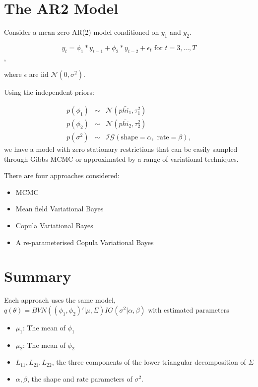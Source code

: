 \documentclass{article}
\begin{document}

\section{The AR2 Model}

Consider a mean zero AR(2) model conditioned on $y_1$ and $y_2$.

$$y_t = \phi_1 * y_{t-1} + \phi_2 * y_{t-2} + \epsilon_t \mbox{ for } t = 3,\dots,T$$,

where $\epsilon$ are iid $\mathcal{N}(0, \sigma^2)$.

Using the independent priors: 

\begin{eqnarray*}
p(\phi_1) & \sim & \mathcal{N}(\bar{phi_1}, \tau_{1}^2) \\
p(\phi_2) & \sim & \mathcal{N}(\bar{phi_2}, \tau_{2}^2) \\
p(\sigma^2) & \sim & \mathcal{IG} (\mbox{shape} = \alpha, \mbox{ rate} = \beta),
\end{eqnarray*}
we have a model with zero stationary restrictions that can be easily sampled through Gibbs MCMC or approximated by a range of variational techniques.

There are four approaches considered:

\begin{itemize}
\item MCMC
\item Mean field Variational Bayes
\item Copula Variational Bayes
\item A re-parameterised Copula Variational Bayes
\end{itemize}

\section{Summary}

Each approach uses the same model, $q(\theta) = BVN((\phi_1, \phi_2)' | \mu, \Sigma) IG(\sigma^2 | \alpha, \beta)$ with estimated parameters
\begin{itemize}
\item $\mu_1$: The mean of $\phi_1$
\item $\mu_2$: The mean of $\phi_2$
\item $L_{11}, L_{21}, L_{22}$, the three components of the lower triangular decomposition of $\Sigma$
\item $\alpha, \beta$, the shape and rate parameters of $\sigma^2$.
\end{itemize}
\end{document}
